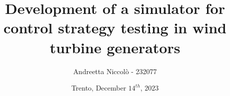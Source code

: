 \author{Andreetta Niccolò - 232077}
\title{Development of a simulator for control strategy testing in wind turbine generators}
\subtitle{}
\institute{}
\date{Trento, December $14^{th}$, 2023}
{
\begin{frame}[plain]
    \maketitle
\end{frame}

}